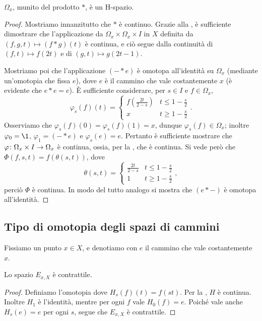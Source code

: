 \begin{proposition}
\(\Omega_x\), munito del prodotto \(\ast\), è un H-spazio.
\end{proposition}
\begin{proof}
Mostriamo innanzitutto che \(\ast\) è continuo. Grazie alla , è sufficiente dimostrare che l'applicazione da \(\Omega_x\times\Omega_x\times I\) in \(X\) definita da \((f,g,t)\mapsto (f\ast g)(t)\) è continua, e ciò segue dalla continuità di \((f,t)\mapsto f(2t)\) e di \((g,t)\mapsto g(2t-1)\).

Mostriamo poi che l'applicazione \((-\ast e)\)
è omotopa all'identità su \(\Omega_x\) (mediante un'omotopia che fissa \(e\)), dove \(e\) è il cammino che vale costantemente \(x\) (è evidente che \(e\ast e=e\)). È sufficiente considerare, per \(s\in I\) e \(f\in\Omega_x\), 
\[
\varphi_s(f)(t)=
\begin{cases}
f\left(\frac{2t}{2-s}\right)&t\le 1-\frac{s}{2}\\
x&t\ge 1-\frac{s}{2}
\end{cases}.
\]
Osserviamo che \(\varphi_s(f)(0)=\varphi_s(f)(1)=x\), dunque \(\varphi_s(f)\in\Omega_x\); inoltre \(\varphi_0=\1\), \(\varphi_1=(-\ast e)\) e \(\varphi_s(e)=e\). Pertanto è sufficiente mostrare che \(\map{\varphi}{\Omega_x\times I}{\Omega_x}\) è continua, ossia, per la , che
è continua. Si vede però che \(\Phi(f,s,t)=f(\theta(s,t))\), dove
\[
\theta(s,t)=
\begin{cases}
\frac{2t}{2-s}&t\le 1-\frac{s}{2}\\
1&t\ge 1-\frac{s}{2}
\end{cases},
\]
perciò \(\Phi\) è continua. In modo del tutto analogo si mostra che \((e\ast-)\) è omotopa all'identità.
\end{proof}

\subsection{Tipo di omotopia degli spazi di cammini}

Fissiamo un punto \(x\in X\), e denotiamo con \(e\) il cammino che vale costantemente \(x\).

\begin{proposition}
Lo spazio \(E_{x,X}\) è contrattile.
\end{proposition}
\begin{proof}
Definiamo l'omotopia
dove \(H_s(f)(t)=f(st)\). Per la , \(H\) è continua. Inoltre \(H_1\) è l'identità, mentre per ogni \(f\) vale \(H_0(f)=e\). Poiché vale anche \(H_s(e)=e\) per ogni \(s\), segue che \(E_{x,X}\) è contrattile.
\end{proof}

